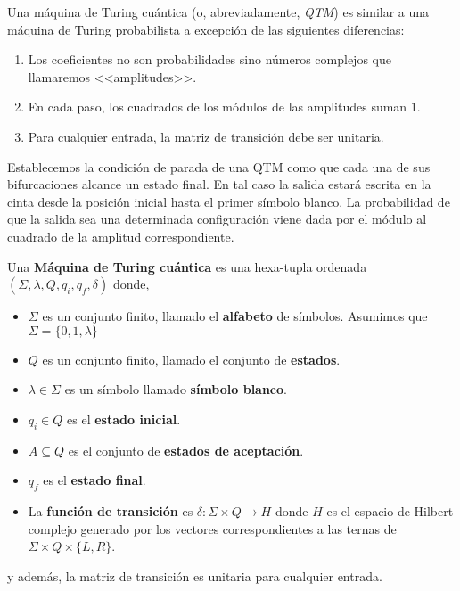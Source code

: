 Una máquina de Turing cuántica (o, abreviadamente, \emph{QTM}) es similar a una máquina de Turing probabilista a excepción de las siguientes diferencias:

\begin{enumerate}
\item Los coeficientes no son probabilidades sino números complejos que llamaremos <<amplitudes>>.

\item En cada paso, los cuadrados de los módulos de las amplitudes suman $1$.

\item Para cualquier entrada, la matriz de transición debe ser unitaria.
\end{enumerate}

Establecemos la condición de parada de una QTM como que cada una de sus bifurcaciones alcance un estado final. En tal caso la salida estará escrita en la cinta desde la posición inicial hasta el primer símbolo blanco. La probabilidad de que la salida sea una determinada configuración viene dada por el módulo al cuadrado de la amplitud correspondiente.\\


\begin{redBox}
\begin{defin}
Una \textbf{Máquina de Turing cuántica} es una hexa-tupla ordenada $(\Sigma, \lambda, Q, q_i, q_f, \delta)$ donde,

\begin{itemize}
\item $\Sigma$ es un conjunto finito, llamado el \textbf{alfabeto} de símbolos. Asumimos que $\Sigma=\{0,1,\lambda\}$
\item $Q$ es un conjunto finito, llamado el conjunto de \textbf{estados}.
\item $\lambda\in \Sigma$ es un símbolo llamado \textbf{símbolo blanco}.
\item $q_i\in Q$ es el \textbf{estado inicial}.
\item $A\subseteq Q$ es el conjunto de \textbf{estados de aceptación}.
\item $q_f$ es el \textbf{estado final}.
\item La \textbf{función de transición} es $\delta: \Sigma \times Q \rightarrow H $ donde $H$ es el espacio de Hilbert complejo generado por los vectores correspondientes a las ternas de $\Sigma \times Q \times \{L,R\}$.
\end{itemize}

y además, la matriz de transición es unitaria para cualquier entrada.
\end{defin}
\end{redBox}

